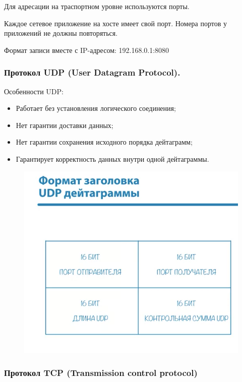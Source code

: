 \documentclass[a4paper,12pt]{article}
\begin{document}
	Для адресации на траспортном уровне используются порты.

	Каждое сетевое приложение на хосте имеет свой порт. Номера портов у приложений не должны повторяться.
	
	Формат записи вместе с IP-адресом:
	192.168.0.1:8080
	
	\subsubsection{Протокол UDP (User Datagram Protocol).}
	
	Особенности UDP:
	
	\begin{itemize}
		\item Работает без установления логического соединения;
		\item Нет гарантии доставки данных;
		\item Нет гарантии сохранения исходного порядка дейтаграмм;
		\item Гарантирует корректность данных внутри одной дейтаграммы.
	\end{itemize}

	\begin{figure}[h!]
		\begin{center}
			{\includegraphics[scale = 1]{5.png}}
			\label{5}
		\end{center}
	\end{figure}

	
	\subsubsection{Протокол TCP (Transmission control protocol)}
		
\end{document}
